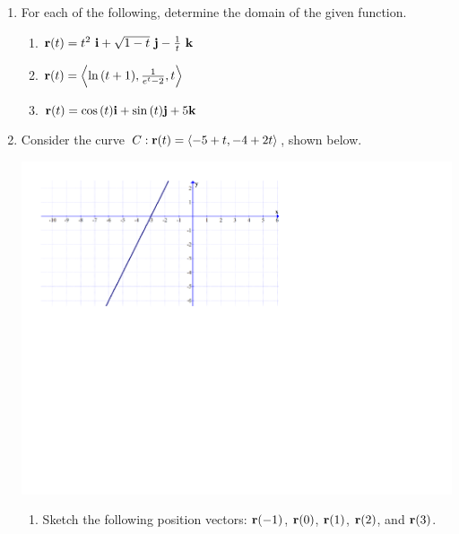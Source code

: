 \documentclass[12pt]{article}
\newif\ifans
\begin{document}
\begin{enumerate}

\item For each of the following, determine the domain of the given function.

\begin{enumerate}

\item ${\bf r}(t)=t^2\text{ }{\bf i}+\sqrt{1-t}\text{ }{\bf j}-\frac{1}{t}\text{ }{\bf k}$

\ifans{\fbox{$(-\infty,0)\cup(0,1]$}} \fi

\item ${\bf r}(t)=\left\langle \ln{(t+1)}, \frac{1}{e^t-2}, t\right\rangle$

\ifans{\fbox{$(-1,\ln2)\cup(\ln2,\infty)$}} \fi

\item ${\bf r}(t)=\cos{(t)}{\bf i}+\sin{(t)}{\bf j}+5{\bf k}$

\ifans{\fbox{$(-\infty,\infty)$}} \fi

\end{enumerate}

\item Consider the curve $C: {\bf r}(t)=\langle -5+t,-4+2t\rangle$, shown below.

\begin{center}
\includegraphics[scale=0.58]{line.pdf}
\end{center}

\begin{enumerate}

\item Sketch the following position vectors: ${\bf r}(-1)$, ${\bf r}(0)$, ${\bf r}(1)$, ${\bf r}(2)$,  and ${\bf r}(3)$. 


\end{enumerate}
\end{enumerate}
\end{document}
